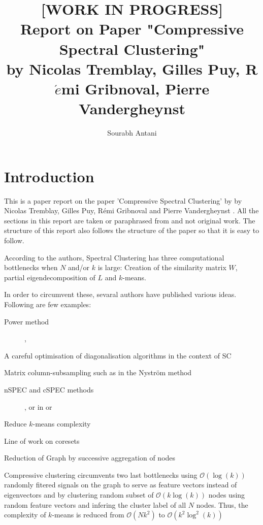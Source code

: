 \documentclass[10pt,a4paper,twoside]{report}
\author{Sourabh Antani}
\title{[WORK IN PROGRESS] \\ Report on Paper "Compressive Spectral Clustering" \\by Nicolas Tremblay, Gilles Puy, R$\acute{e}$mi Gribnoval, Pierre Vandergheynst}
\date{}
\theoremstyle{definition}
\begin{document}
	\maketitle

	\thispagestyle{fancy}
	\chapter{Introduction}
	This is a paper report on the paper 'Compressive Spectral Clustering' by by Nicolas Tremblay, Gilles Puy, R\'{e}mi Gribnoval and Pierre Vandergheynst \cite{tremblay-compressive-SC-16}. All the sections in this report are taken or paraphrased from \cite{tremblay-compressive-SC-16} and not original work. The structure of this report also follows the structure of the paper so that it is easy to follow.

	According to the authors, Spectral Clustering has three computational bottlenecks when $N$ and/or $k$ is large: Creation of the similarity matrix $W$, partial eigendecomposition of $L$ and $k$-means.
	
	In order to circumvent these, sevaral authors have published various ideas. Following are few examples:
	\begin{description}
		\item[Power method] \cite{pmlr-v37-boutsidis15},  \cite{pic-icml10}
		\item[A  careful  optimisation  of  diagonalisation  algorithms  in  the  context  of  SC]  \cite{liu-2007}
		\item[Matrix column-subsampling such as in the Nystr\"{o}m method]  \cite{Fowlkes-2004}
		\item[nSPEC  and  cSPEC methods] \cite{wang-2009}, or in \cite{chen-2011} or \cite{sakai-2009}
		\item[Reduce $k$-means complexity] \cite{jain-2010}
		\item[Line of work on coresets] \cite{har-peled-2004}
		\item[Reduction of Graph by successive aggregation of nodes] \cite{dhillon-2007} \cite{filippone-2008}
	\end{description}
	
	Compressive clustering circumvents two last bottlenecks using $\mathcal{O}(\log(k))$ randomly fitered signals on the graph to serve as feature vectors instead of eigenvectors and by clustering random subset of $\mathcal{O}(k\log(k))$ nodes using random feature vectors and infering the cluster label of all $N$ nodes. Thus, the complexity of $k$-means is reduced from $\mathcal{O}(Nk^{2})$ to $\mathcal{O}(k^2\log^2(k))$
	
\end{document}
